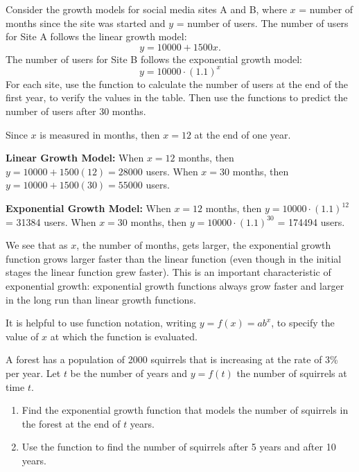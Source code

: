 \begin{example}\label{example_linear_vs_exponential_growth}
    Consider the growth models for social media sites A and B, where \( x \) = number of months since the site was started and \( y \) = number of users.
    The number of users for Site A follows the linear growth model:
    \[ y = 10000 + 1500x. \]
    The number of users for Site B follows the exponential growth model:
    \[ y = 10000 \cdot (1.1)^x \]
    For each site, use the function to calculate the number of users at the end of the first year, to verify the values in the table. Then use the functions to predict the number of users after 30 months.
\end{example}

\begin{solution}
    Since \( x \) is measured in months, then \( x = 12 \) at the end of one year.

    \textbf{Linear Growth Model:}
    When \( x = 12 \) months, then \( y = 10000 + 1500(12) = 28000 \) users.
    When \( x = 30 \) months, then \( y = 10000 + 1500(30) = 55000 \) users.

    \textbf{Exponential Growth Model:}
    When \( x = 12 \) months, then \( y = 10000 \cdot (1.1)^{12} \) = 31384 users. %
    When \( x = 30 \) months, then \( y = 10000 \cdot (1.1)^{30} \) = 174494 users. %
\end{solution}

We see that as \( x \), the number of months, gets larger, the exponential growth function grows larger faster than the linear function (even though in the initial stages the linear function grew faster). This is an important characteristic of exponential growth: exponential growth functions always grow faster and larger in the long run than linear growth functions.

It is helpful to use function notation, writing \( y = f(x) = ab^x \), to specify the value of \( x \) at which the function is evaluated.

\begin{example}
    A forest has a population of 2000 squirrels that is increasing at the rate of 3\% per year. Let \( t \) be the number of years and \( y = f(t) \) the number of squirrels at time \( t \).

    \begin{enumerate}
        \item Find the exponential growth function that models the number of squirrels in the forest at the end of \( t \) years.
        \item Use the function to find the number of squirrels after 5 years and after 10 years.
    \end{enumerate}
\end{example}

